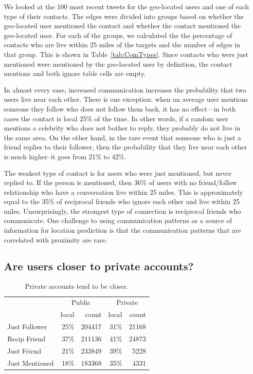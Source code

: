 We looked at the 100 most recent tweets for the geo-located users and one of
each type of their contacts.
%
The edges were divided into groups based on whether the geo-located user
mentioned the contact and whether the contact mentioned the geo-located user.
%
For each of the groups, we calculated the the percentage of contacts who are
live within 25 miles of the targets and the number of edges in that group.
%
This is shown in Table~\ref{tab:ComTypes}.
%
Since contacts who were just mentioned were mentioned by the geo-located
user by definition, the contact mentions and both ignore table cells are
empty.

In almost every case, increased communication increases the probability that
two users live near each other.
%
There is one exception: when an average user mentions someone they follow who
does not follow them back, it has no effect---in both cases the contact is
local 25\% of the time.
%
In other words, if a random user mentions a celebrity who does not bother to
reply, they probably do not live in the same area.
%
On the other hand, in the rare event that someone who is just a friend replies
to their follower, then the probability that they live near each other is much
higher--it goes from 21\% to 42\%.

The weakest type of contact is for users who were just mentioned, but never
replied to.
%
If the person is mentioned, then 36\% of users with no
friend/follow relationship who have a conversation live within 25 miles.
%
This is approximately equal to the 35\% of reciprocal friends who ignore each
other and live within 25 miles.
%
Unsurprisingly, the strongest type of connection is reciprocal friends who
communicate.
%
One challenge to using communication patterns as a source of information for
location prediction is that the communication patterns that are correlated
with proximity are rare.

\subsection{Are users closer to private accounts?}

\begin{table}[tbh]
\centering
\begin{tabular}{l | r r | r r}
    & \multicolumn{2}{c}{Public}
    & \multicolumn{2}{|c}{Private} \\
    \cline{2-5}
    &local&count&local&count \\
    \hline
    Just Follower & 25\%&204417 & 31\%&21168 \\
    Recip Friend & 37\%&211136 & 41\%&24873 \\
    Just Friend & 21\%&233849 & 39\%&5228 \\
    Just Mentioned & 18\%&183368 & 35\%&4331 \\
\end{tabular}
\caption{
    Private accounts tend to be closer.
}
\label{tab:EdgeTypesProt}
\end{table}

